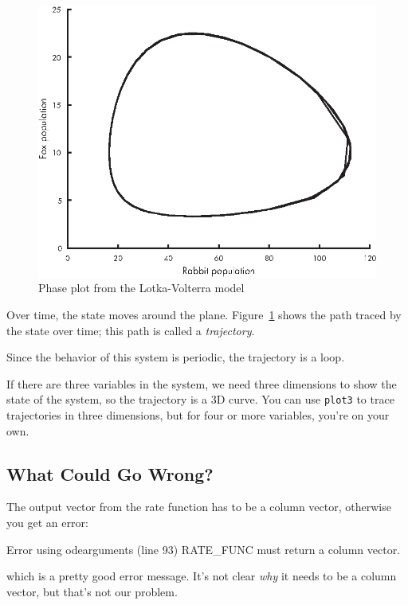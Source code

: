 \begin{figure}[ht]
\includegraphics{book/images/figure10_02_new.eps}
\caption{Phase plot from the Lotka-Volterra model}
\label{fig:phase}
\end{figure}


Over time, the state moves around the plane. Figure~\ref{fig:phase} shows
the path traced by the state over time; this path
is called a \emph{trajectory}.

Since the behavior of this system is periodic, the trajectory is a loop.

If there are three variables in the system, we need three dimensions to show
the state of the system, so the trajectory is a 3D curve.
You can use \lstinline{plot3} to trace trajectories in three dimensions,
but for four or more variables, you're on your own.



\subsection{What Could Go Wrong?}

The output vector from the rate function has to be a column vector, otherwise you get an error:

\begin{code}
Error using odearguments (line 93)
RATE_FUNC must return a column vector.
\end{code}
which is a pretty good error message.  It's not clear \emph{why}
it needs to be a column vector, but that's not our problem.

